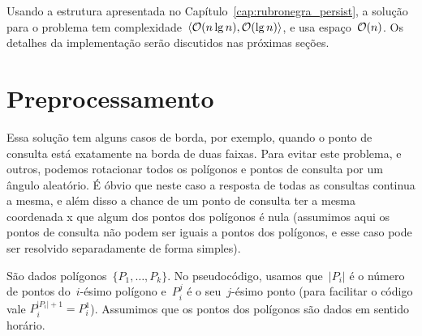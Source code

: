 \documentclass[main.tex]{subfiles}
\begin{document}
Usando a estrutura apresentada no Capítulo~\ref{cap:rubronegra_persist}, a solução para o problema tem complexidade~$\langle\mathcal{O}(n \lg n), \mathcal{O}(\lg n)\rangle$, e usa espaço~$\mathcal{O}(n)$. Os detalhes da implementação serão discutidos nas próximas seções.

\section{Preprocessamento}

Essa solução tem alguns casos de borda, por exemplo, quando o ponto de consulta está exatamente na borda de duas faixas. Para evitar este problema, e outros, podemos rotacionar todos os polígonos e pontos de consulta por um ângulo aleatório. É óbvio que neste caso a resposta de todas as consultas continua a mesma, e além disso a chance de um ponto de consulta ter a mesma coordenada x que algum dos pontos dos polígonos é nula (assumimos aqui os pontos de consulta não podem ser iguais a pontos dos polígonos, e esse caso pode ser resolvido separadamente de forma simples).

\providecommand{\from}{\V{from}}
\providecommand{\tto}{\V{to}}
\providecommand{\seg}{\V{seg}}
\providecommand{\events}{\V{events}}
\providecommand{\rbt}{\V{rbt}}
\providecommand{\slabs}{\V{slabs}}
\providecommand{\current}{\V{current}}
\providecommand{\polygon}{\V{polygon}}

São dados polígonos~$\{P_1, \ldots, P_k\}$. No pseudocódigo, usamos que~$|P_i|$ é o número de pontos do~$i$-ésimo polígono e~$P_i^j$ é o seu~$j$-ésimo ponto (para facilitar o código vale ${P_i^{|P_i|+1} = P_i^1}$). Assumimos que os pontos dos polígonos são dados em sentido horário.
\end{document}
